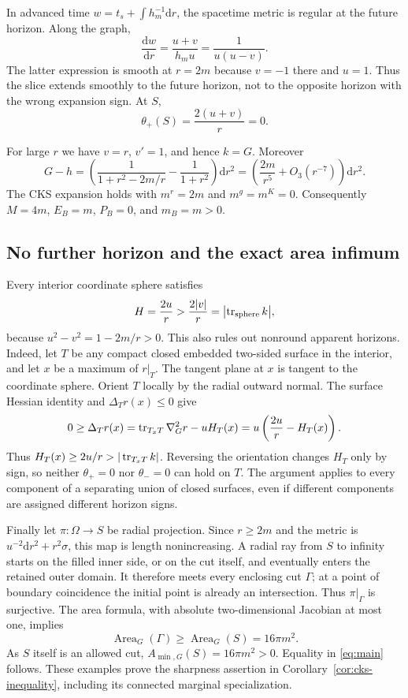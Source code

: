 In advanced time $w=t_s+\int h_m^{-1}\mathrm dr$, the spacetime metric
is regular at the future horizon. Along the graph,
\[
 \frac{\mathrm dw}{\mathrm dr}
 =\frac{u+v}{h_m u}=\frac1{u(u-v)}.
\]
The latter expression is smooth at $r=2m$ because $v=-1$ there and
$u=1$. Thus the slice extends smoothly to the future horizon, not to
the opposite horizon with the wrong expansion sign. At $S$,
\[
 \theta_+(S)=\frac{2(u+v)}r=0.
\]

For large $r$ we have $v=r$, $v'=1$, and hence $k=G$. Moreover
\[
 G-h=\left(\frac1{1+r^2-2m/r}-\frac1{1+r^2}\right)\mathrm dr^2
 =\left(\frac{2m}{r^5}+O_3(r^{-7})\right)\mathrm dr^2.
\]
The CKS expansion holds with $m^r=2m$ and $m^g=m^K=0$.
Consequently $M=4m$, $E_B=m$, $P_B=0$, and $m_B=m>0$.

\subsection{No further horizon and the exact area infimum}
Every interior coordinate sphere satisfies
\begin{equation}\label{eq:sphere-barrier}
 H=\frac{2u}{r}>\frac{2|v|}{r}
 =\bigl|\operatorname{tr}_{\mathrm{sphere}}k\bigr|,
\end{equation}
because $u^2-v^2=1-2m/r>0$. This also rules out nonround apparent
horizons. Indeed, let $T$ be any compact closed embedded two-sided
surface in the interior, and let $x$ be a maximum of $r|_T$. The
tangent plane at $x$ is tangent to the coordinate sphere. Orient $T$
locally by the radial outward normal. The surface Hessian identity
and $\Delta_T r(x)\leq0$ give
\[
 0\geq\Delta_T r(x)
 =\operatorname{tr}_{T_xT}\nabla_G^2r-uH_T(x)
 =u\left(\frac{2u}{r}-H_T(x)\right).
\]
Thus $H_T(x)\geq2u/r>|\operatorname{tr}_{T_xT}k|$. Reversing the orientation
changes $H_T$ only by sign, so neither $\theta_+=0$ nor $\theta_-=0$
can hold on $T$. The argument applies to every component of a
separating union of closed surfaces, even if different components
are assigned different horizon signs.

Finally let $\pi:\Omega\to S$ be radial projection. Since $r\geq2m$
and the metric is $u^{-2}\mathrm dr^2+r^2\sigma$, this map is length
nonincreasing. A radial ray from $S$ to infinity starts on the filled
inner side, or on the cut itself, and eventually enters the retained
outer domain. It therefore meets every enclosing cut $\Gamma$;
at a point of boundary coincidence the initial point is already an
intersection. Thus $\pi|_\Gamma$ is
surjective. The area formula, with absolute two-dimensional Jacobian
at most one, implies
\[
 \operatorname{Area}_G(\Gamma)\geq\operatorname{Area}_G(S)
 =16\pi m^2.
\]
As $S$ itself is an allowed cut,
$A_{\min,G}(S)=16\pi m^2>0$. Equality in \eqref{eq:main} follows.
These examples prove the sharpness assertion in
Corollary~\ref{cor:cks-inequality}, including its connected marginal
specialization.
